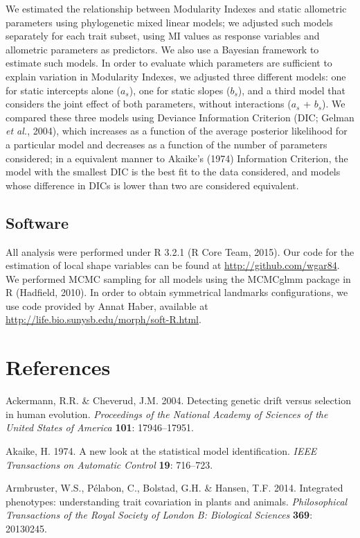 \documentclass[12pt,]{article}
\begin{document}
We estimated the relationship between Modularity Indexes and static
allometric parameters using phylogenetic mixed linear models; we
adjusted such models separately for each trait subset, using MI values
as response variables and allometric parameters as predictors. We also
use a Bayesian framework to estimate such models. In order to evaluate
which parameters are sufficient to explain variation in Modularity
Indexes, we adjusted three different models: one for static intercepts
alone ($a_s$), one for static slopes ($b_s$), and a third model that
considers the joint effect of both parameters, without interactions
($a_s$ + $b_s$). We compared these three models using Deviance
Information Criterion (DIC; Gelman \emph{et al.}, 2004), which increases
as a function of the average posterior likelihood for a particular model
and decreases as a function of the number of parameters considered; in a
equivalent manner to Akaike's (1974) Information Criterion, the model
with the smallest DIC is the best fit to the data considered, and models
whose difference in DICs is lower than two are considered equivalent.

\subsection{Software}\label{software}

All analysis were performed under R 3.2.1 (R Core Team, 2015). Our code
for the estimation of local shape variables can be found at
\url{http://github.com/wgar84}. We performed MCMC sampling for all
models using the MCMCglmm package in R (Hadfield, 2010). In order to
obtain symmetrical landmarks configurations, we use code provided by
Annat Haber, available at
\url{http://life.bio.sunysb.edu/morph/soft-R.html}.

\section*{References}\label{references}

Ackermann, R.R. \& Cheverud, J.M. 2004. Detecting genetic drift versus
selection in human evolution. \emph{Proceedings of the National Academy
of Sciences of the United States of America} \textbf{101}: 17946--17951.

Akaike, H. 1974. A new look at the statistical model identification.
\emph{IEEE Transactions on Automatic Control} \textbf{19}: 716--723.

Armbruster, W.S., Pélabon, C., Bolstad, G.H. \& Hansen, T.F. 2014.
Integrated phenotypes: understanding trait covariation in plants and
animals. \emph{Philosophical Transactions of the Royal Society of London
B: Biological Sciences} \textbf{369}: 20130245.
\end{document}
